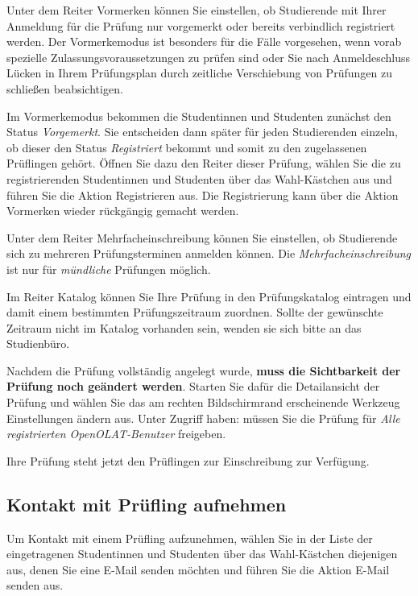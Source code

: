 \documentclass[a4paper,11pt]{article}
\newcommand{\knopf}[1]{{\sc #1}}
\begin{document}
Unter dem Reiter \knopf{Vormerken} können Sie einstellen, ob Studierende mit
Ihrer Anmeldung für die Prüfung nur vorgemerkt oder bereits verbindlich
registriert werden.  Der Vormerkemodus ist besonders für die Fälle vorgesehen,
wenn vorab spezielle Zulassungsvoraussetzungen zu prüfen sind oder Sie nach
Anmeldeschluss Lücken in Ihrem Prüfungsplan durch zeitliche Verschiebung von
Prüfungen zu schließen beabsichtigen.  

Im Vormerkemodus bekommen die Studentinnen und Studenten zunächst den Status
{\em Vorgemerkt}. Sie entscheiden dann später für jeden Studierenden einzeln,
ob dieser den Status {\em Registriert} bekommt und somit zu den zugelassenen
Prüflingen gehört.
Öffnen Sie dazu den Reiter dieser Prüfung, wählen Sie die zu registrierenden
Studentinnen und Studenten über das Wahl-Kästchen aus und führen
Sie die Aktion \knopf{Registrieren} aus. Die Registrierung kann über die Aktion
\knopf{Vormerken} wieder rückgängig gemacht werden.

Unter dem Reiter \knopf{Mehrfacheinschreibung} können Sie einstellen, ob
Studierende sich zu mehreren Prüfungsterminen anmelden können.
Die {\em Mehrfacheinschreibung} ist nur für {\em mündliche} Prüfungen möglich.

Im Reiter \knopf{Katalog} können Sie Ihre Prüfung in den Prüfungskatalog
eintragen und damit einem bestimmten Prüfungszeitraum zuordnen. Sollte der
gewünschte Zeitraum nicht im Katalog vorhanden sein, wenden sie sich bitte an
das Studienbüro.

Nachdem die Prüfung vollständig angelegt wurde, {\bf muss die Sichtbarkeit der
  Prüfung noch geändert werden}. Starten Sie dafür die \knopf{Detailansicht}
der Prüfung und wählen Sie das am rechten Bildschirmrand erscheinende Werkzeug
\knopf{Einstellungen ändern} aus. Unter \knopf{Zugriff haben:} müssen Sie die
Prüfung für {\em Alle registrierten OpenOLAT-Benutzer} freigeben.  

Ihre Prüfung steht jetzt den Prüflingen zur Einschreibung zur Verfügung.

\subsection{Kontakt mit Prüfling aufnehmen}

Um Kontakt mit einem Prüfling aufzunehmen, wählen Sie in der Liste der
eingetragenen Studentinnen und Studenten über das Wahl-Kästchen
diejenigen aus, denen Sie eine E-Mail senden möchten und führen Sie die Aktion
\knopf{E-Mail senden} aus.
\end{document}
